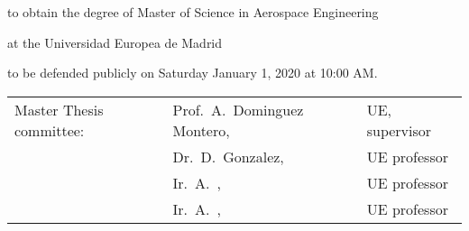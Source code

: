 \begin{titlepage}
\begin{center}





\bigskip
\bigskip


{\makeatletter

\largetitlestyle\fontsize{20}{20}\selectfont\@author
\makeatother}

\bigskip
\bigskip

to obtain the degree of Master of Science in Aerospace Engineering

\bigskip


at the  Universidad Europea de Madrid

\bigskip


to be defended publicly on Saturday January 1, 2020 at 10:00 AM.


\vfill
\large{
\begin{tabular}{lll}
    Master Thesis committee: & Prof.\ A.\ Dominguez Montero, & UE, supervisor \\
        & Dr.\ D.\ Gonzalez, & UE professor \\
        & Ir.\ A.\ , & UE professor \\
        & Ir.\ A.\ , & UE professor \\
\end{tabular}
}




\end{center}



\end{titlepage}

